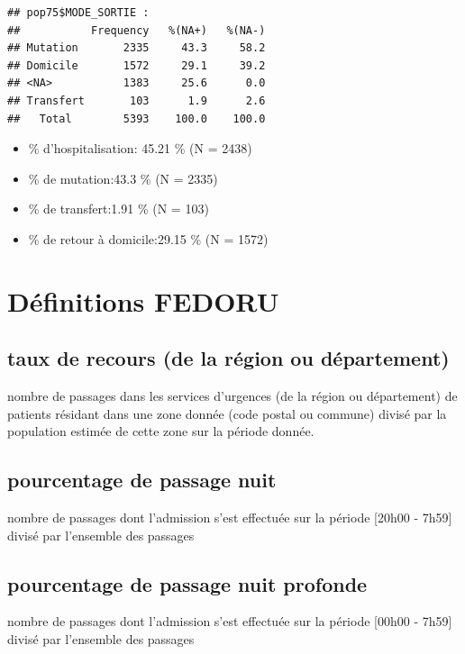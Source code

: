 \documentclass[]{article}
\begin{document}
\begin{verbatim}
## pop75$MODE_SORTIE : 
##           Frequency   %(NA+)   %(NA-)
## Mutation       2335     43.3     58.2
## Domicile       1572     29.1     39.2
## <NA>           1383     25.6      0.0
## Transfert       103      1.9      2.6
##   Total        5393    100.0    100.0
\end{verbatim}

\begin{itemize}
\itemsep1pt\parskip0pt
\item
  \% d'hospitalisation: 45.21 \% (N = 2438)
\item
  \% de mutation:43.3 \% (N = 2335)
\item
  \% de transfert:1.91 \% (N = 103)
\item
  \% de retour à domicile:29.15 \% (N = 1572)
\end{itemize}

\section{Définitions FEDORU}\label{definitions-fedoru}

\subsection{taux de recours (de la région ou
département)}\label{taux-de-recours-de-la-region-ou-departement}

nombre de passages dans les services d'urgences (de la région ou
département) de patients résidant dans une zone donnée (code postal ou
commune) divisé par la population estimée de cette zone sur la période
donnée.

\subsection{pourcentage de passage
nuit}\label{pourcentage-de-passage-nuit}

nombre de passages dont l'admission s'est effectuée sur la période
{[}20h00 - 7h59{]} divisé par l'ensemble des passages

\subsection{pourcentage de passage nuit
profonde}\label{pourcentage-de-passage-nuit-profonde}

nombre de passages dont l'admission s'est effectuée sur la période
{[}00h00 - 7h59{]} divisé par l'ensemble des passages
\end{document}
